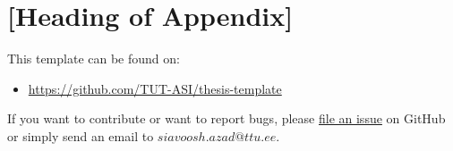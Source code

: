 \section{[Heading of Appendix]}
This template can be found on:
\begin{itemize}
\item \url{https://github.com/TUT-ASI/thesis-template}
\end{itemize}


If you want to contribute or want to report bugs, please
\href{https://github.com/TUT-ASI/thesis-template/issues}{file an issue}
on GitHub or simply send an email to $siavoosh.azad@ttu.ee$.
